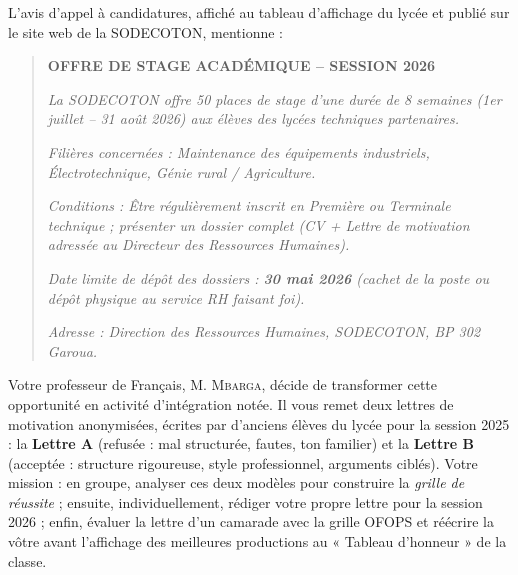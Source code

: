 \documentclass[11pt]{article}
\begin{document}
\par
L'avis d'appel à candidatures, affiché au tableau d'affichage du lycée et publié sur le site web de la SODECOTON, mentionne :
\begin{quote}
\textbf{OFFRE DE STAGE ACADÉMIQUE -- SESSION 2026}\par
\emph{La SODECOTON offre 50 places de stage d'une durée de 8 semaines (1er juillet -- 31 août 2026) aux élèves des lycées techniques partenaires.}\par
\emph{Filières concernées : Maintenance des équipements industriels, Électrotechnique, Génie rural / Agriculture.}\par
\emph{Conditions : Être régulièrement inscrit en Première ou Terminale technique ; présenter un dossier complet (CV + Lettre de motivation adressée au Directeur des Ressources Humaines).}\par
\emph{Date limite de dépôt des dossiers : \textbf{30 mai 2026} (cachet de la poste ou dépôt physique au service RH faisant foi).}\par
\emph{Adresse : Direction des Ressources Humaines, SODECOTON, BP 302 Garoua.}
\end{quote}

\par
Votre professeur de Français, M. \textsc{Mbarga}, décide de transformer cette opportunité en activité d'intégration notée. Il vous remet deux lettres de motivation anonymisées, écrites par d'anciens élèves du lycée pour la session 2025 : la \textbf{Lettre A} (refusée : mal structurée, fautes, ton familier) et la \textbf{Lettre B} (acceptée : structure rigoureuse, style professionnel, arguments ciblés). Votre mission : en groupe, analyser ces deux modèles pour construire la \emph{grille de réussite} ; ensuite, individuellement, rédiger votre propre lettre pour la session 2026 ; enfin, évaluer la lettre d'un camarade avec la grille OFOPS et réécrire la vôtre avant l'affichage des meilleures productions au « Tableau d'honneur » de la classe.
\end{document}
